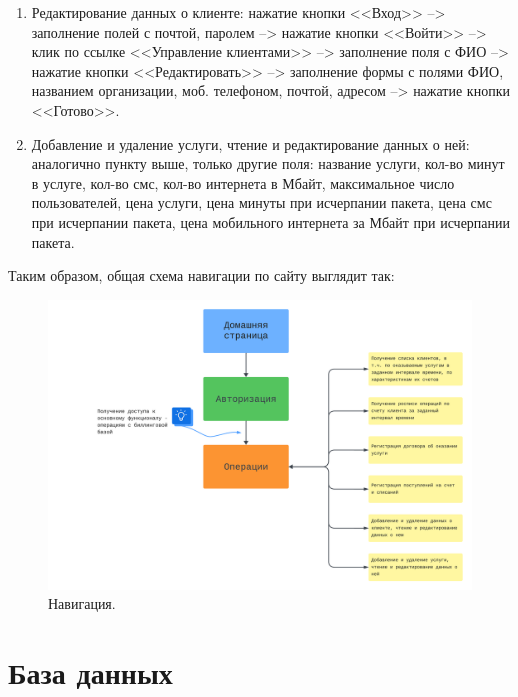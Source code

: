 \documentclass[oneside,senior,etd]{BYUPhysForDegree}
\begin{document}
\begin{enumerate}
    \item Редактирование данных о клиенте:
    нажатие кнопки <<Вход>> --> заполнение полей с почтой, паролем --> нажатие кнопки <<Войти>> --> клик по ссылке <<Управление клиентами>> --> заполнение поля с ФИО --> нажатие кнопки <<Редактировать>> --> заполнение формы с полями ФИО, названием организации, моб. телефоном, почтой, адресом --> нажатие кнопки <<Готово>>.

    \item Добавление и удаление услуги, чтение и редактирование данных о ней:
    аналогично пункту выше, только другие поля: название услуги, кол-во минут в услуге, кол-во смс, кол-во интернета в Мбайт, максимальное число пользователей, цена услуги, цена минуты при исчерпании пакета, цена смс при исчерпании пакета, цена мобильного интернета за Мбайт при исчерпании пакета.

\end{enumerate}

\newpage
Таким образом, общая схема навигации по сайту выглядит так:

\begin{figure}[hbt!]
    \centering
    \includegraphics[width=1.0\linewidth]{sitemap.png}
    \caption{Навигация.}
    \label{fig:sitemap}
\end{figure}

\newpage
\section{База данных}
\end{document}
